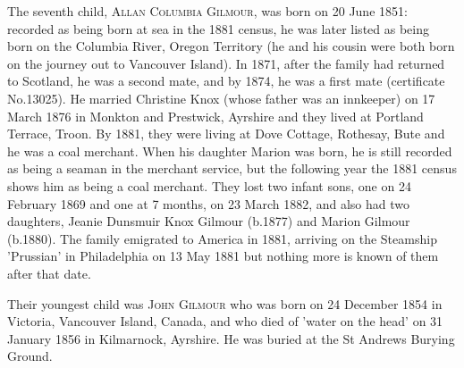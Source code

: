 The seventh child, \textsc{Allan Columbia Gilmour}, was born on 20 June 1851: recorded as being born at sea in the 1881 census, he was later listed as being born on the Columbia River, Oregon Territory (he and his cousin were both born on the journey out to Vancouver Island). In 1871, after the family had returned to Scotland, he was a second mate, and by 1874, he was a first mate (certificate No.13025). He married Christine Knox (whose father was an innkeeper) on 17 March 1876 in Monkton and Prestwick, Ayrshire and they lived at Portland Terrace, Troon. By 1881, they were living at Dove Cottage, Rothesay, Bute and he was a coal merchant.   When his daughter Marion was born, he is still recorded as being a seaman in the merchant service, but the following year the 1881 census shows him as being a coal merchant. They lost two infant sons, one on 24 February 1869 and one at 7 months, on 23 March 1882, and also had two daughters, Jeanie Dunsmuir Knox Gilmour (b.1877) and Marion Gilmour (b.1880). The family emigrated to America in 1881, arriving on the Steamship 'Prussian' in Philadelphia on 13 May 1881 but nothing more is known of them after that date.

Their youngest child was \textsc{John Gilmour} who was born on 24 December 1854 in Victoria, Vancouver Island, Canada, and who died of 'water on the head' on 31 January 1856 in Kilmarnock, Ayrshire. He was buried at the St Andrews Burying Ground.



  

